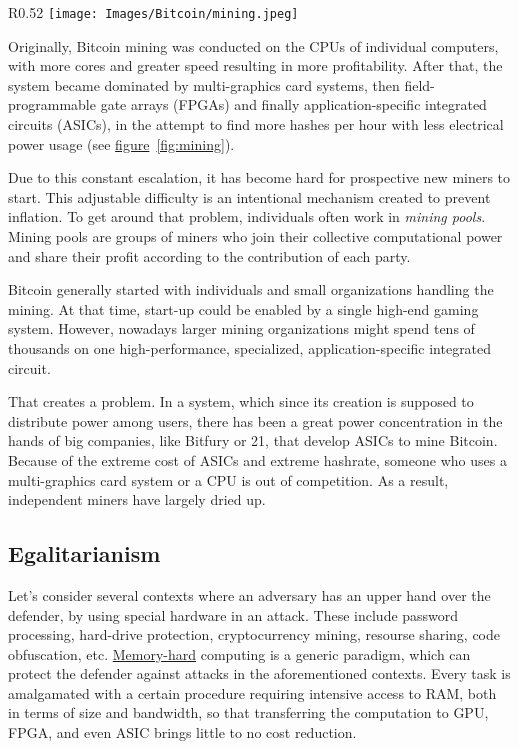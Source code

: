 \begin{wrapfigure}{R}{0.52\textwidth}
  \centering
  \texttt{[image: Images/Bitcoin/mining.jpeg]}
  \caption{Mining options}
  \label{fig:mining}
\end{wrapfigure}
Originally, Bitcoin mining was conducted on the CPUs of individual computers, with more cores and greater speed resulting in more profitability. After that, the system became dominated by multi-graphics card systems, then field-programmable gate arrays (FPGAs) and finally application-specific integrated circuits (ASICs), in the attempt to find more hashes per hour with less electrical power usage (see \hyperref[fig:mining]{figure}~\ref{fig:mining}).

Due to this constant escalation, it has become hard for prospective new miners to start. This adjustable difficulty is an intentional mechanism created to prevent inflation. To get around that problem, individuals often work in \emph{mining pools}. Mining pools are groups of miners who join their collective computational power and share their profit according to the contribution of each party.

Bitcoin generally started with individuals and small organizations handling the mining. At that time, start-up could be enabled by a single high-end gaming system. However, nowadays larger mining organizations might spend tens of thousands on one high-performance, specialized, application-specific integrated circuit.

That creates a problem. In a system, which since its creation is supposed to distribute power among users, there has been a great power concentration in the hands of big companies, like Bitfury or 21, that develop ASICs to mine Bitcoin. Because of the extreme cost of ASICs and extreme hashrate, someone who uses a multi-graphics card system or a CPU is out of competition. As a result, independent miners have largely dried up.

\subsection{Egalitarianism} \label{sec:egalitarian}
Let's consider several contexts where an adversary has an upper hand over the defender, by using special hardware in an attack. These include password processing, hard-drive protection, cryptocurrency mining, resourse sharing, code obfuscation, etc. \hyperref[sec:memory-hard]{Memory-hard} computing is a generic paradigm, which can protect the defender against attacks in the aforementioned contexts. Every task is amalgamated with a certain procedure requiring intensive access to RAM, both in terms of size and bandwidth, so that transferring the computation to GPU, FPGA, and even ASIC brings little to no cost reduction.

